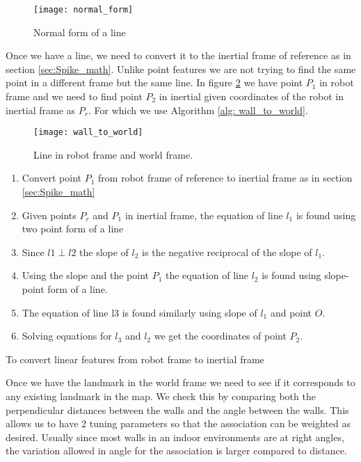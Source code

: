 \begin{figure}
\centering
\texttt{[image: normal\_form]}
\caption{Normal form of a line}
\label{fig: normal_form}
\end{figure}

Once we have a line, we need to convert it to the inertial frame of reference as in section \ref{sec:Spike_math}. Unlike point features we are not trying to find the same point in a different frame but the same line. In figure \ref{fig: wall_to_world} we have point $ P_1 $ in robot frame and we need to find point $ P_2 $ in inertial given coordinates of the robot in inertial frame as $ P_r $. For which we use Algorithm \ref{alg: wall_to_world}.
\begin{figure}
\centering
\texttt{[image: wall\_to\_world]}
\caption{Line in robot frame and world frame.}
\label{fig: wall_to_world}
\end{figure}

\begin{algorithm}
	\begin{enumerate}
		\item Convert point $ P_1 $ from robot frame of reference to inertial frame as in section \ref{sec:Spike_math}
		\item Given points $ P_r $ and $ P_1 $ in inertial frame, the equation of line $ l_1 $ is found using two point form of a line
		\item Since $ l1 \perp l2 $ the slope of $ l_2 $ is the negative reciprocal of the slope of $ l_1 $. 
		\item Using the slope and the point $ P_1 $ the equation of line $ l_2 $ is found using slope-point form of a line.
		\item The equation of line l3 is found similarly using slope of $ l_1 $ and point $ O $. 
		\item Solving equations for $ l_3 $ and $ l_2 $ we get the coordinates of point $ P_2 $. 
	\end{enumerate}
\caption{To convert linear features from robot frame to inertial frame}
\label{alg: wall_to_world}
\end{algorithm}

Once we have the landmark in the world frame we need to see if it corresponds to any existing landmark in the map. We check this by comparing both the perpendicular distances between the walls and the angle between the walls. This allows us to have 2 tuning parameters so that the association can be weighted as desired. Usually since most walls in an indoor environments are at right angles, the variation allowed in angle for the association is larger compared to distance. 

